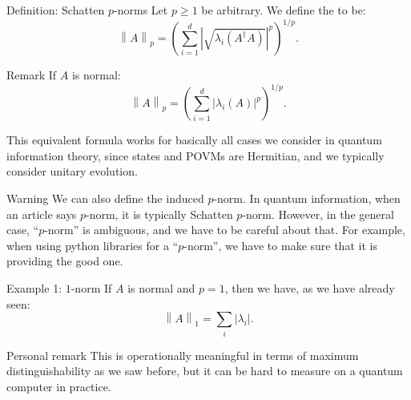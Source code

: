 \documentclass[a4paper]{article}
\begin{document}
\begin{parag}{Definition: Schatten $p$-norms}
    Let $p \geq 1$ be arbitrary. We define the  to be: 
    \[\left\|A\right\|_p = \left(\sum_{i=1}^{d} \left|\sqrt{\lambda_i\left(A^{\dagger} A\right)}\right|^p\right)^{1/p}.\]

    \begin{subparag}{Remark}
        If $A$ is normal: 
        \[\left\|A\right\|_p = \left(\sum_{i=1}^{d} \left|\lambda_i\left(A\right)\right|^p\right)^{1/p}.\]

        This equivalent formula works for basically all cases we consider in quantum information theory, since states and POVMs are Hermitian, and we typically consider unitary evolution.
    \end{subparag}

    \begin{subparag}{Warning}
        We can also define the induced $p$-norm. In quantum information, when an article says $p$-norm, it is typically Schatten $p$-norm. However, in the general case, ``$p$-norm'' is ambiguous, and we have to be careful about that. For example, when using python libraries for a ``$p$-norm'', we have to make sure that it is providing the good one.
    \end{subparag}
\end{parag}

\begin{parag}{Example 1: $1$-norm}
    If $A$ is normal and $p = 1$, then we have, as we have already seen: 
    \[\left\|A\right\|_1 = \sum_{i} \left|\lambda_i\right|.\]

    \begin{subparag}{Personal remark}
        This is operationally meaningful in terms of maximum distinguishability as we saw before, but it can be hard to measure on a quantum computer in practice. 
    \end{subparag} 
\end{parag}
\end{document}
